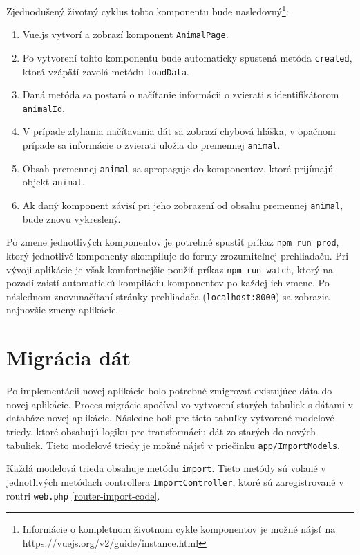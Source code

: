 Zjednodušený životný cyklus tohto komponentu bude nasledovný\footnote{Informácie o kompletnom životnom cykle komponentov je možné nájsť na https://vuejs.org/v2/guide/instance.html}:
\begin{enumerate}
	\item Vue.js vytvorí a zobrazí komponent \texttt{AnimalPage}.
	\item Po vytvorení tohto komponentu bude automaticky spustená metóda \texttt{created}, ktorá vzápätí zavolá metódu \texttt{loadData}.
	\item Daná metóda sa postará o načítanie informácii o zvierati s identifikátorom \texttt{animalId}.
	\item V prípade zlyhania načítavania dát sa zobrazí chybová hláška, v opačnom prípade sa informácie o zvierati uložia do premennej \texttt{animal}.
	\item Obsah premennej \texttt{animal} sa spropaguje do komponentov, ktoré prijímajú objekt \texttt{animal}.
	\item Ak daný komponent závisí pri jeho zobrazení od obsahu premennej \texttt{animal}, bude znovu vykreslený.
\end{enumerate}

Po zmene jednotlivých komponentov je potrebné spustiť príkaz \texttt{npm run prod}, ktorý jednotlivé komponenty skompiluje do formy zrozumiteľnej prehliadaču. Pri vývoji aplikácie je však komfortnejšie použiť príkaz \texttt{npm run watch}, ktorý na pozadí zaistí automatickú kompiláciu komponentov po každej ich zmene. Po následnom znovunačítaní stránky prehliadača (\texttt{localhost:8000}) sa zobrazia najnovšie zmeny aplikácie.

\pagebreak

\section{Migrácia dát}
Po implementácii novej aplikácie bolo potrebné zmigrovať existujúce dáta do novej aplikácie. Proces migrácie spočíval vo vytvorení starých tabuliek s dátami v databáze novej aplikácie. Následne boli pre tieto tabuľky vytvorené modelové triedy, ktoré obsahujú logiku pre transformáciu dát zo starých do nových tabuliek. Tieto modelové triedy je možné nájsť v priečinku \texttt{app/ImportModels}.

Každá modelová trieda obsahuje metódu \texttt{import}. Tieto metódy sú volané v jednotlivých metódach controllera \texttt{ImportController}, ktoré sú zaregistrované v routri \texttt{web.php} \ref{router-import-code}.

